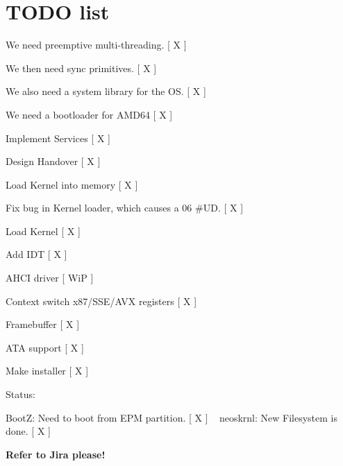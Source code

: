 \chapter{TODO list}
\hypertarget{md_dev_2_kernel_2doc_2_todo_list}{}\label{md_dev_2_kernel_2doc_2_todo_list}
\label{md_dev_2_kernel_2doc_2_todo_list_autotoc_md15}%
%

\begin{DoxyItemize}
\item We need preemptive multi-\/threading. \mbox{[} X \mbox{]}
\item We then need sync primitives. \mbox{[} X \mbox{]}
\item We also need a system library for the OS. \mbox{[} X \mbox{]}
\item We need a bootloader for AMD64 \mbox{[} X \mbox{]}
\begin{DoxyItemize}
\item Implement  Services \mbox{[} X \mbox{]}
\item Design Handover \mbox{[} X \mbox{]}
\item Load Kernel into memory \mbox{[} X \mbox{]}
\item Fix bug in Kernel loader, which causes a 06 \#\+UD. \mbox{[} X \mbox{]}
\item Load Kernel \mbox{[} X \mbox{]}
\item Add IDT \mbox{[} X \mbox{]}
\item AHCI driver \mbox{[} WiP \mbox{]}
\end{DoxyItemize}
\item Context switch x87/\+SSE/\+AVX registers \mbox{[} X \mbox{]}
\item Framebuffer \mbox{[} X \mbox{]}
\item ATA support \mbox{[} X \mbox{]}
\item Make installer \mbox{[} X \mbox{]}
\end{DoxyItemize}

Status\+:

BootZ\+: Need to boot from EPM partition. \mbox{[} X \mbox{]} ~\newline
 neoskrnl\+: New Filesystem is done. \mbox{[} X \mbox{]}

{\bfseries{Refer to Jira please!}} 